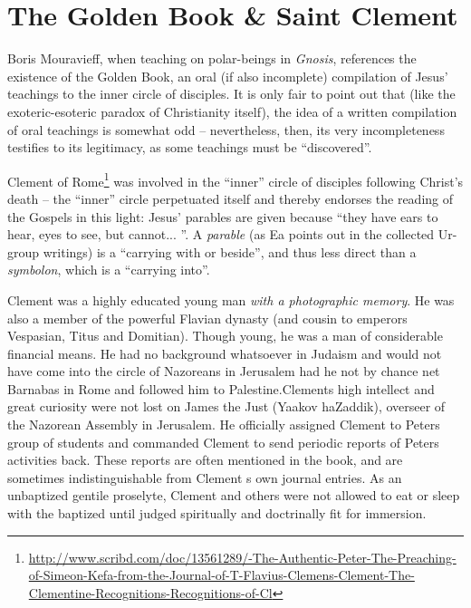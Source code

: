 \section{The Golden Book \& Saint Clement}

Boris Mouravieff, when teaching on polar-beings in \emph{Gnosis}, references the existence of the Golden Book, an oral (if also incomplete) compilation of Jesus' teachings to the inner circle of disciples. It is only fair to point out that (like the exoteric-esoteric paradox of Christianity itself), the idea of a written compilation of oral teachings is somewhat odd -- nevertheless, then, its very incompleteness testifies to its legitimacy, as some teachings must be ``discovered''.

Clement of Rome\footnote{\url{http://www.scribd.com/doc/13561289/-The-Authentic-Peter-The-Preaching-of-Simeon-Kefa-from-the-Journal-of-T-Flavius-Clemens-Clement-The-Clementine-Recognitions-Recognitions-of-Cl}} was involved in the ``inner'' circle of disciples following Christ's death -- the ``inner'' circle perpetuated itself and thereby endorses the reading of the Gospels in this light: Jesus' parables are given because ``they have ears to hear, eyes to see, but cannot... ''. A \emph{parable} (as Ea points out in the collected Ur-group writings) is a ``carrying with or beside'', and thus less direct than a \emph{symbolon}, which is a ``carrying into''.

\begin{quotex}
Clement was a highly educated young man \emph{with a photographic memory}. He was also a member of the powerful Flavian dynasty (and cousin to emperors Vespasian, Titus and Domitian). Though young, he was a man of considerable financial means. He had no background whatsoever in Judaism and would not have come into the circle of Nazoreans in Jerusalem had he not by chance net Barnabas in Rome and followed him to Palestine.Clements high intellect and great curiosity were not lost on James the Just (Yaakov haZaddik), overseer of the Nazorean Assembly in Jerusalem. He officially assigned Clement to Peters group of students and commanded Clement to send periodic reports of Peters activities back. These reports are often mentioned in the book, and are sometimes indistinguishable from Clement s own journal entries. As an unbaptized gentile proselyte, Clement and others were not allowed to eat or sleep with the baptized until judged spiritually and doctrinally fit for immersion.
\end{quotex}


